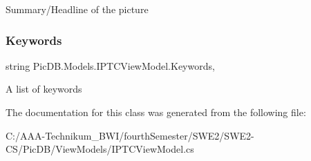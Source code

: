 Summary/\+Headline of the picture 

\mbox{\label{class_pic_d_b_1_1_models_1_1_i_p_t_c_view_model_a6abcbb58c1a4b9f8ddda13046da6cf32}} 
\subsubsection{\texorpdfstring{Keywords}{Keywords}}
{\footnotesize\ttfamily string Pic\+D\+B.\+Models.\+I\+P\+T\+C\+View\+Model.\+Keywords\hspace{0.3cm}{\ttfamily [get]}, {\ttfamily [set]}}



A list of keywords 



The documentation for this class was generated from the following file\+:\begin{DoxyCompactItemize}
\item 
C\+:/\+A\+A\+A-\/\+Technikum\+\_\+\+B\+W\+I/fourth\+Semester/\+S\+W\+E2/\+S\+W\+E2-\/\+C\+S/\+Pic\+D\+B/\+View\+Models/I\+P\+T\+C\+View\+Model.\+cs\end{DoxyCompactItemize}
